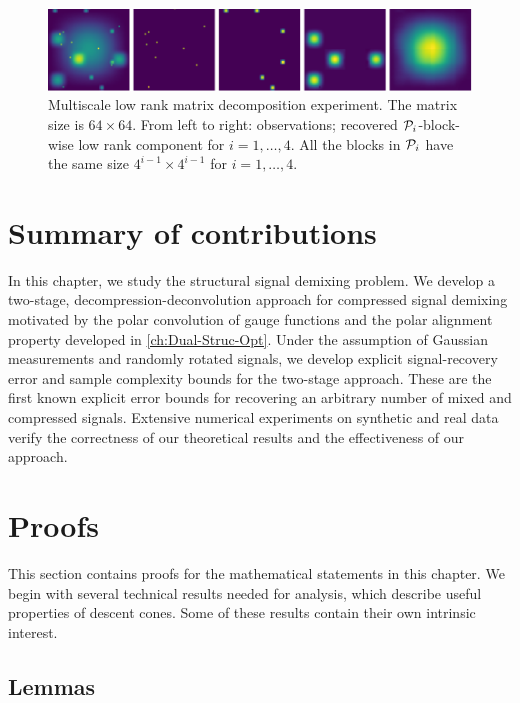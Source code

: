 \begin{figure}[t]
    \centering
    \includegraphics[width=\textwidth]{./figures/Multiscale.pdf}
    \caption{Multiscale low rank matrix decomposition experiment. The matrix size is $64\times64$. From left to right: observations; recovered $\mathcal{P}_i$-block-wise low rank component for $i = 1,\dots,4$. All the blocks in $\mathcal{P}_i$ have the same size $4^{i-1}\times4^{i-1}$ for $i = 1,\dots,4$.}
    \label{fig:multiscale}
\end{figure}

\section{Summary of contributions}\label{sec:3-6}

In this chapter, we study the structural signal demixing problem. We develop a two-stage, decompression-deconvolution approach for compressed signal demixing motivated by the polar convolution of gauge functions and the polar alignment property developed in \autoref{ch:Dual-Struc-Opt}. Under the assumption of Gaussian measurements and randomly rotated signals, we develop explicit signal-recovery error and sample complexity bounds for the two-stage approach. These are the first known explicit error bounds for recovering an arbitrary number of mixed and compressed signals. Extensive numerical experiments on synthetic and real data verify the correctness of our theoretical results and the effectiveness of our approach.




\section{Proofs} \label{sec:3-7}

This section contains proofs for the mathematical statements in this chapter. We begin with several technical results needed for analysis, which describe useful properties of descent cones. Some of these results contain their own intrinsic interest.

\subsection{Lemmas} \label{sec:3-7-1}

